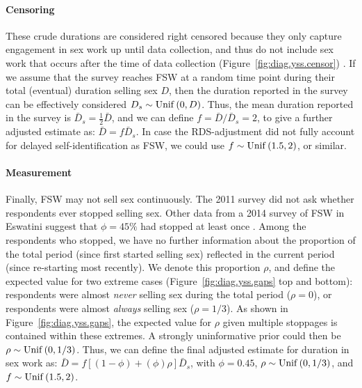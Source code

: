 \paragraph{Censoring}
These crude durations are considered right censored %
because they only capture engagement in sex work up until data collection, and 
thus do not include sex work that occurs after the time of data collection  %
(Figure~\ref{fig:diag.yss.censor}) \cite{Fazito2012}.
If we assume that the survey reaches FSW
at a random time point during their total (eventual) duration selling sex $D$,
then the duration reported in the survey can be effectively considered $D_s \sim \mathrm{Unif}\,(0,D)$.
Thus, the mean duration reported in the survey is $\bar{D}_s = \frac12 \bar{D}$,
and we can define $f = \bar{D} / \bar{D}_s = 2$,
to give a further adjusted estimate as: $\bar{D} = f\bar{D}_s$.
In case the RDS-adjustment did not fully account for delayed self-identification as FSW,
we could use $f \sim \mathrm{Unif}\,(1.5,2)$, or similar.
\paragraph{Measurement}
Finally, FSW may not sell sex continuously.
The 2011 survey did not ask whether respondents ever stopped selling sex. 
Other data from a 2014 survey of FSW in Eswatini suggest that $\phi = 45\%$ had stopped at least once \cite{EswKP2014}.  %
Among the respondents who stopped, we have no further information about
the proportion of the total period (\ie since first started selling sex)
reflected in the current period (\ie since re-starting most recently). %
We denote this proportion $\rho$, and define the expected value for two extreme cases
(Figure~\ref{fig:diag.yss.gaps} top and bottom):
respondents were almost \emph{never} selling sex during the total period ($\rho = 0$), or
respondents were almost \emph{always} selling sex ($\rho = 1/3$).
As shown in Figure~\ref{fig:diag.yss.gaps},
the expected value for $\rho$ given multiple stoppages is contained within these extremes.
A strongly uninformative prior could then be $\rho \sim \mathrm{Unif}\,(0,1/3)$.
Thus, we can define the final adjusted estimate for duration in sex work as:
$\bar{D} = f[(1-\phi)+(\phi)\rho]\bar{D}_s$, with
$\phi = 0.45$, $\rho \sim \mathrm{Unif}\,(0,1/3)$, and $f \sim \mathrm{Unif}\,(1.5,2)$.
